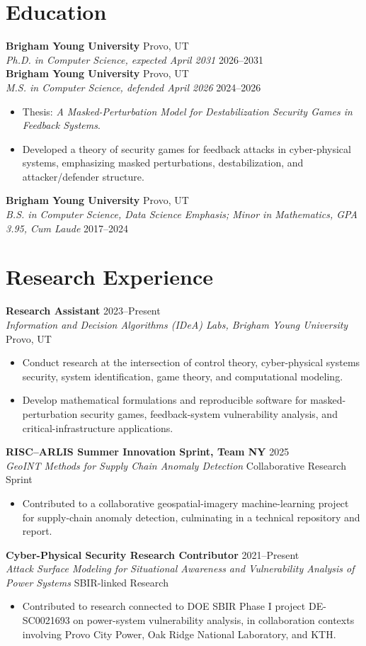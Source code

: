 \documentclass[10pt,letterpaper]{article}
\newcommand{\entry}[4]{%
  \textbf{#1} \hfill {\color{muted}#2}\\
  \emph{#3} \hfill {\color{muted}#4}\\[-0.2em]
}
\begin{document}
\section{Education}
\entry{Brigham Young University}{Provo, UT}{Ph.D. in Computer Science, expected April 2031}{2026--2031}
\entry{Brigham Young University}{Provo, UT}{M.S. in Computer Science, defended April 2026}{2024--2026}
\begin{itemize}
    \item Thesis: \emph{A Masked-Perturbation Model for Destabilization Security Games in Feedback Systems}.
    \item Developed a theory of security games for feedback attacks in cyber-physical systems, emphasizing masked perturbations, destabilization, and attacker/defender structure.
\end{itemize}
\entry{Brigham Young University}{Provo, UT}{B.S. in Computer Science, Data Science Emphasis; Minor in Mathematics, GPA 3.95, Cum Laude}{2017--2024}

\section{Research Experience}
\entry{Research Assistant}{2023--Present}{Information and Decision Algorithms (IDeA) Labs, Brigham Young University}{Provo, UT}
\begin{itemize}
    \item Conduct research at the intersection of control theory, cyber-physical systems security, system identification, game theory, and computational modeling.
    \item Develop mathematical formulations and reproducible software for masked-perturbation security games, feedback-system vulnerability analysis, and critical-infrastructure applications.
\end{itemize}

\entry{RISC--ARLIS Summer Innovation Sprint, Team NY}{2025}{GeoINT Methods for Supply Chain Anomaly Detection}{Collaborative Research Sprint}
\begin{itemize}
    \item Contributed to a collaborative geospatial-imagery machine-learning project for supply-chain anomaly detection, culminating in a technical repository and report.
\end{itemize}

\entry{Cyber-Physical Security Research Contributor}{2021--Present}{Attack Surface Modeling for Situational Awareness and Vulnerability Analysis of Power Systems}{SBIR-linked Research}
\begin{itemize}
    \item Contributed to research connected to DOE SBIR Phase I project DE-SC0021693 on power-system vulnerability analysis, in collaboration contexts involving Provo City Power, Oak Ridge National Laboratory, and KTH.
\end{itemize}
\end{document}
